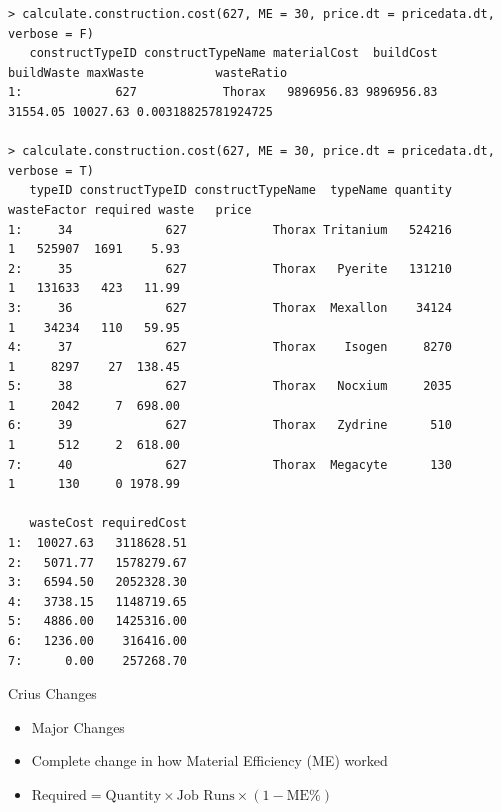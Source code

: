 \documentclass[12pt]{beamer}
\begin{document}
\begin{frame}[fragile]
\begin{verbatim}
> calculate.construction.cost(627, ME = 30, price.dt = pricedata.dt, verbose = F)
   constructTypeID constructTypeName materialCost  buildCost buildWaste maxWaste          wasteRatio
1:             627            Thorax   9896956.83 9896956.83   31554.05 10027.63 0.00318825781924725

> calculate.construction.cost(627, ME = 30, price.dt = pricedata.dt, verbose = T)
   typeID constructTypeID constructTypeName  typeName quantity wasteFactor required waste   price
1:     34             627            Thorax Tritanium   524216           1   525907  1691    5.93
2:     35             627            Thorax   Pyerite   131210           1   131633   423   11.99
3:     36             627            Thorax  Mexallon    34124           1    34234   110   59.95
4:     37             627            Thorax    Isogen     8270           1     8297    27  138.45
5:     38             627            Thorax   Nocxium     2035           1     2042     7  698.00
6:     39             627            Thorax   Zydrine      510           1      512     2  618.00
7:     40             627            Thorax  Megacyte      130           1      130     0 1978.99

   wasteCost requiredCost
1:  10027.63   3118628.51
2:   5071.77   1578279.67
3:   6594.50   2052328.30
4:   3738.15   1148719.65
5:   4886.00   1425316.00
6:   1236.00    316416.00
7:      0.00    257268.70
\end{verbatim}
\end{frame}


\begin{frame}[fragile]{Crius Changes}

\begin{itemize}
\item<2-> Major Changes
\item<3-> Complete change in how Material Efficiency (ME) worked
\item<4-> $\text{Required} = \text{Quantity} \times \text{Job Runs} \times (1 - \text{ME}\%)$
\end{itemize}

\end{frame}
\end{document}
